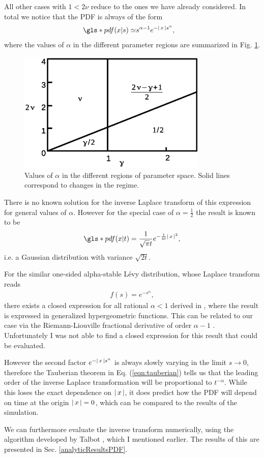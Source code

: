 All other cases with $1< 2\nu$ reduce to the ones we have already considered. In total we notice that the \gls*{PDF} is always of the form 
%
\begin{align}
\gls*{pdf}(x|s)\simeq & s^{\alpha-1} e^{-\abs{x} s^{\alpha}} ,
\end{align}
%
where the values of $\alpha$ in the different parameter regions are summarized in Fig. \ref{fig:alphaValuesPDF}.
%
\begin{figure}[h!]
\begin{center}
\includegraphics[width=90mm]{pics/alphaValuesPDF.eps}
\caption{Values of $\alpha$ in the different regions of parameter space. Solid lines correspond to changes in the regime.
\label{fig:alphaValuesPDF} }
\end{center}
\end{figure} 
%
There is no known solution for the inverse Laplace transform of this expression for general values of $\alpha$. However for the special case of $\alpha = \frac{1}{2} $ the result is known to be
%
\begin{align}
\gls*{pdf}(x|t) = \frac{1}{\sqrt{\pi}t}e^{-\frac{1}{4t}\abs{x}^2} ,
\end{align}
%
i.e. a Gaussian distribution with variance $\sqrt{2t}$. 

For the similar one-sided alpha-stable L\'evy distribution, whose Laplace transform reads
%
\begin{align}
f(s) = e^{-s^{\alpha}},
\end{align}
%
there exists a closed expression for all rational $\alpha<1$ derived in 
\cite{penson2010}, 
where the result is expressed in generalized hypergeometric functions. This can be related to our case via the Riemann-Liouville fractional derivative of order $\alpha-1$ 
\cite{mathai2009}. 
Unfortunately I was not able to find a closed expression for this result that could be evaluated.

However the second factor $e^{-\left|\,x\,\right|s^{\alpha}}$ is always slowly varying in the limit $s \to 0$, therefore the Tauberian theorem in Eq. (\ref{eqn:tauberian}) tells us that the leading order of the inverse Laplace transformation will be proportional to $t^{-\alpha}$. While this loses the exact dependence on $\left|\,x\,\right|$, it does predict how the \gls*{PDF} will depend on time at the origin $\left|\,x\,\right|=0$, which can be compared to the results of the simulation.

We can furthermore evaluate the inverse transform numerically, using the algorithm developed by Talbot 
\cite{talbot1979}, 
which I mentioned earlier. The results of this are presented in Sec. \ref{analyticResultsPDF}.